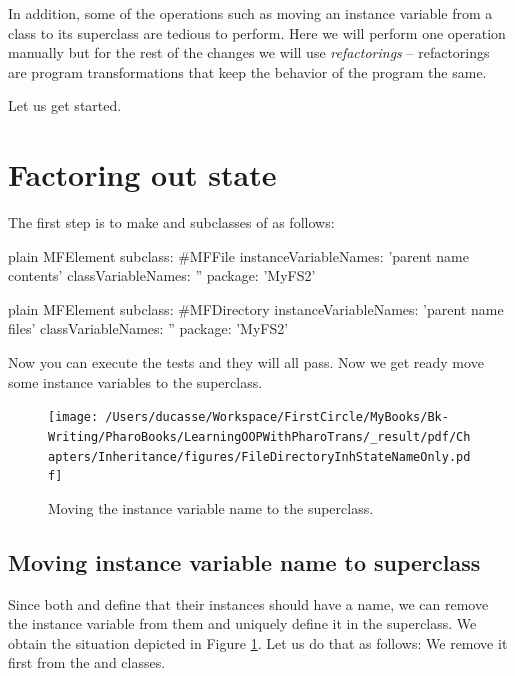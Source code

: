 \documentclass[10pt,twoside,english]{_support/latex/sbabook/sbabook}
\begin{document}
In addition, some of the operations such as moving an instance variable from a class to its superclass are tedious to perform. Here we will perform one operation manually but for the rest of the changes we will use \textit{refactorings} -- refactorings are program transformations that keep the behavior of the program the same.

Let us get started.
\section{Factoring out state}
The first step is to make  and  subclasses of  as follows:

\begin{displaycode}{plain}
MFElement subclass: #MFFile
	instanceVariableNames: 'parent name contents'
	classVariableNames: ''
	package: 'MyFS2'
\end{displaycode}

\begin{displaycode}{plain}
MFElement subclass: #MFDirectory
	instanceVariableNames: 'parent name files'
	classVariableNames: ''
	package: 'MyFS2'
\end{displaycode}

Now you can execute the tests and they will all pass. Now we get ready move some instance variables to the superclass.


\begin{figure}

\begin{center}
\texttt{[image: /Users/ducasse/Workspace/FirstCircle/MyBooks/Bk-Writing/PharoBooks/LearningOOPWithPharoTrans/\_result/pdf/Chapters/Inheritance/figures/FileDirectoryInhStateNameOnly.pdf]}\caption{Moving the instance variable name to the superclass.\label{FileDirectoryInhStateNameOnly}}\end{center}
\end{figure}

\subsection{Moving instance variable name to superclass}
Since both  and  define that their instances should have a name, we can remove the instance variable  from them and uniquely define it in the superclass. We obtain the situation depicted in Figure \ref{FileDirectoryInhStateNameOnly}.
Let us do that as follows: We remove it first from the  and  classes.
\end{document}
